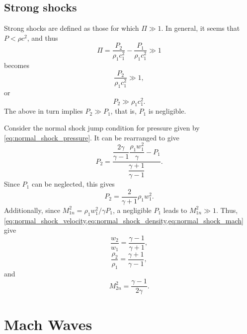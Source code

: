 \documentclass[oneside,a4paper,11pt]{report}
\begin{document}
\subsection{Strong shocks}
Strong shocks are defined as those for which $\Pi \gg 1$. In general, it seems that $P < \rho c^2$, and thus
\begin{equation}
    \Pi =  \frac{P_2}{\rho_1 c_1^2} - \frac{P_1}{\rho_1 c_1^2} \gg 1
\end{equation}
becomes
\begin{equation}
    \frac{P_2}{\rho_1 c_1^2}  \gg 1,
\end{equation}
or
\begin{equation}
    P_2 \gg \rho_1 c_1^2.
\end{equation}
The above in turn implies $P_2 \gg P_1$, that is, $P_1$ is negligible.

Consider the normal shock jump condition for pressure given by \cref{eq:normal_shock_pressure}. It can be rearranged to give
\begin{equation}
P_2 = \dfrac{ \dfrac{2 \gamma}{\gamma - 1} \dfrac{\rho_1 w_1^2}{\gamma} - P_1}{\dfrac{\gamma + 1}{\gamma - 1}}.
\end{equation}
Since $P_1$ can be neglected, this gives
\begin{equation}
\label{eq:normal_shock_pressure_strong}
    P_2 = \frac{2}{\gamma + 1} \rho_1 w_1^2.
\end{equation}
Additionally, since $M_{1n}^2 = \rho_1 w_1^2 / \gamma P_1$, a negligible $P_1$ leads to $M_{1n}^2 \gg 1$. Thus, \cref{eq:normal_shock_velocity,eq:normal_shock_density,eq:normal_shock_mach} give
\begin{equation}
\label{eq:normal_shock_velocity_strong}
    \frac{w_2}{w_1} = \frac{\gamma -1}{\gamma + 1},
\end{equation}
\begin{equation}
\label{eq:normal_shock_density_strong}
    \frac{\rho_2}{\rho_1} = \frac{\gamma + 1}{\gamma -1},
\end{equation}
and
\begin{equation}
\label{eq:normal_shock_mach_strong}
    M_{2n}^2 = \frac{\gamma - 1}{2\gamma}.
\end{equation}


\section{Mach Waves}
\end{document}
